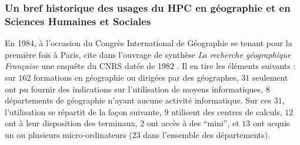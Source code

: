 


\subsubsection{Un bref historique des usages du HPC en géographie et en Sciences Humaines et Sociales}
\label{sssec:histo_centrecalcul}



En 1984, à l'occasion du Congrès International de Géographie se tenant pour la première fois à Paris, \textcite{Faugieres1984} cite dans l'ouvrage de synthèse \textit{La recherche géographique Française} une enquête du CNRS datée de 1982 . Il en tire les éléments suivants : sur $162$ formations en géographie ou dirigées par des géographes, $31$ seulement ont pu fournir des indications sur l'utilisation de moyens informatiques, $8$ départements de géographie n'ayant aucune activité informatique. Sur ces $31$, l'utilisation se répartit de la façon suivante, $9$ utilisent des centres de calculs, $12$ ont à leur disposition des terminaux, $2$ ont accès à des \enquote{mini}, et $13$ ont acquis un ou plusieurs micro-ordinateurs ($23$ dans l'ensemble des départements).

